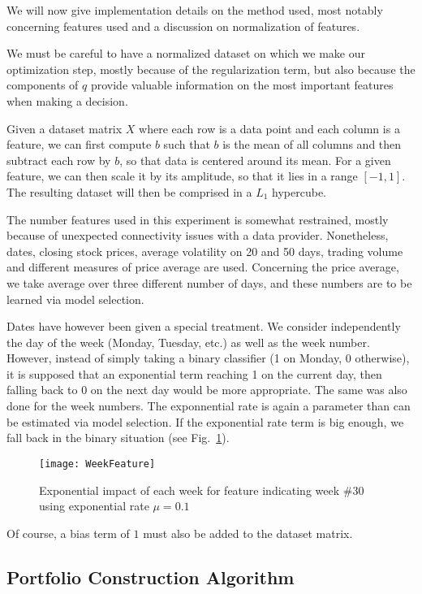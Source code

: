 \documentclass[11pt,fleqn]{article}
\newcommand{\figref}[1]{Fig.~\ref{#1}}
\begin{document}
We will now give implementation details on the method used, most notably concerning
features used and a discussion on normalization of features.

We must be careful to have a normalized dataset on which we make our optimization step,
mostly because of the regularization term, but also because the components of $q$ provide
valuable information on the most important features when making a decision. 

Given a dataset matrix $X$ where each row is a data point and each column is a feature, we
can first compute $b$ such that $b$ is the mean of all columns and then subtract each row
by $b$, so that data is centered around its mean. For a given feature, we can then scale
it by its amplitude, so that it lies in a range $[-1,1]$. The resulting dataset will then
be comprised in a $L_1$ hypercube. 

The number features used in this experiment is somewhat restrained, mostly because of
unexpected connectivity issues with a data provider. Nonetheless, dates, closing stock
prices, average volatility on 20 and 50 days, trading volume and different measures of
price average are used. Concerning the price average, we take average over three different
number of days, and these numbers are to be learned via model selection. 

Dates have however been given a special treatment. We consider independently the day of
the week (Monday, Tuesday, etc.) as well as the week number. However, instead of simply
taking a binary classifier (1 on Monday, 0 otherwise), it is supposed that an exponential
term reaching 1 on the current day, then falling back to 0 on the next day would be more
appropriate. The same was also done for the week numbers. The exponnential rate is again a
parameter than can be estimated via model selection. If the exponential rate term is big
enough, we fall back in the binary situation (see \figref{fig:weekfeature}).

\begin{figure}
  \centering
  \texttt{[image: WeekFeature]}
  \caption{Exponential impact of each week for feature indicating week \#30 using
    exponential rate $\mu=0.1$}
  \label{fig:weekfeature}
\end{figure}

Of course, a bias term of $1$ must also be added to the dataset matrix. 


\subsection{Portfolio Construction Algorithm}
\end{document}
